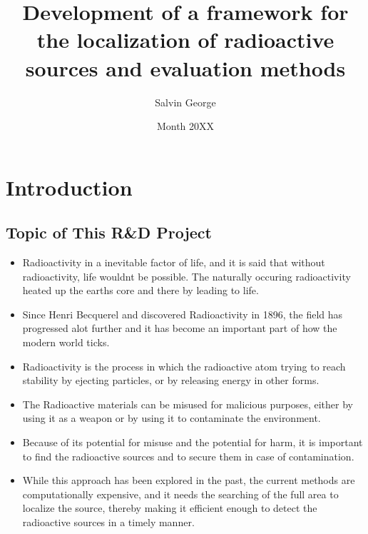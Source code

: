 \documentclass[rnd]{mas_proposal}
\title{Development of a framework for the localization of radioactive sources and evaluation methods}
\author{Salvin George}
\date{Month 20XX}
\begin{document}
\maketitle

\pagestyle{plain}

\section{Introduction}

\subsection{Topic of This R\&D Project}
\begin{itemize}
    \item Radioactivity in a inevitable factor of life, and it is said that without radioactivity, life wouldnt be possible. The naturally occuring radioactivity heated up the earths core and there by leading to life.\cite{DOEExplainsRadioactivity}
    \item Since Henri Becquerel and discovered Radioactivity in 1896, the field has progressed alot further and it has become an important part of how the modern world ticks.
    \item Radioactivity is the process in which the radioactive atom trying to reach stability by ejecting particles, or by releasing energy in other forms.
    \item The Radioactive materials can be misused for malicious purposes, either by using it as a weapon or by using it to contaminate the environment.
    \item Because of its potential for misuse and the potential for harm, it is important to find the radioactive sources and to secure them in case of contamination. 
    \item While this approach has been explored in the past, the current methods are computationally expensive, and it needs the searching of the full area to localize the source, thereby making it efficient enough to detect the radioactive sources in a timely manner.

\end{itemize}
\end{document}
